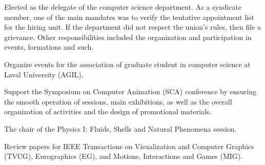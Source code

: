 \documentclass[10pt]{article} %
\begin{document}
{
Elected as the delegate of the computer science department. As a syndicate member, one of the main mandates was to verify the tentative appointment list for the hiring unit. If the department did not respect the union's rules, then file a grievance. Other responsibilities included the organization and participation in events, formations and such.\\
}

{
Organize events for the association of graduate student in computer science at Laval University (AGIL).\\
}

{
Support the Symposium on Computer Animation (SCA) conference by ensuring the smooth operation of sessions, main exhibitions, as well as the overall organization of activities and the design of promotional materials.\\
}

{
The chair of the Physics I: Fluids, Shells and Natural Phenomena session.\\
}

{
Review papers for IEEE Transactions on Visualization and Computer Graphics (TVCG), Eurographics (EG), and Motions, Interactions and Games (MIG).\\
}





\end{document}
